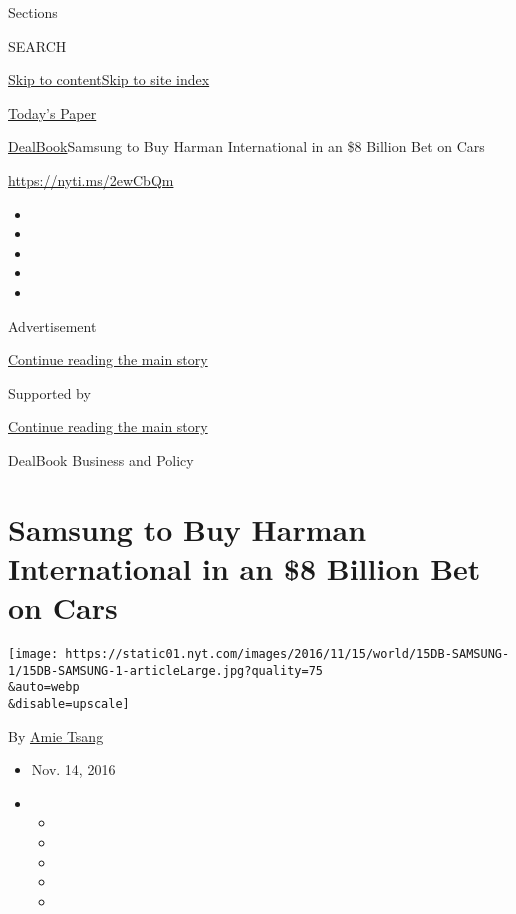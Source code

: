 Sections

SEARCH

\protect\hyperlink{site-content}{Skip to
content}\protect\hyperlink{site-index}{Skip to site index}

\href{https://myaccount.nytimes.com/auth/login?response_type=cookie\&client_id=vi}{}

\href{https://www.nytimes.com/section/todayspaper}{Today's Paper}

\href{/section/business/dealbook}{DealBook}\textbar{}Samsung to Buy
Harman International in an \$8 Billion Bet on Cars

\url{https://nyti.ms/2ewCbQm}

\begin{itemize}
\item
\item
\item
\item
\item
\end{itemize}

Advertisement

\protect\hyperlink{after-top}{Continue reading the main story}

Supported by

\protect\hyperlink{after-sponsor}{Continue reading the main story}

DealBook Business and Policy

\hypertarget{samsung-to-buy-harman-international-in-an-8-billion-bet-on-cars}{%
\section{Samsung to Buy Harman International in an \$8 Billion Bet on
Cars}\label{samsung-to-buy-harman-international-in-an-8-billion-bet-on-cars}}

\texttt{[image: https://static01.nyt.com/images/2016/11/15/world/15DB-SAMSUNG-1/15DB-SAMSUNG-1-articleLarge.jpg?quality=75\\\&auto=webp\\\&disable=upscale]}

By \href{http://www.nytimes.com/by/amie-tsang}{Amie Tsang}

\begin{itemize}
\item
  Nov. 14, 2016
\item
  \begin{itemize}
  \item
  \item
  \item
  \item
  \item
  \end{itemize}
\end{itemize}

